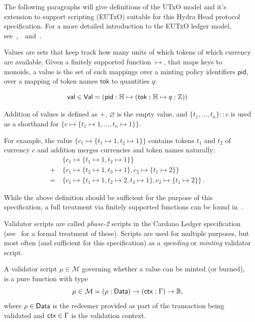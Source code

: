 The following paragraphs will give definitions of the UTxO model and it's
extension to support scripting (EUTxO) suitable for this Hydra Head protocol
specification. For a more detailed introduction to the EUTxO ledger model,
see~\cite{eutxo},~\cite{eutxo-2}~and~\cite{utxo-ma}.

\begin{definition}[Values]
  Values are sets that keep track how many units of which tokens of which
  currency are available. Given a finitely supported function $\mapsto$, that
  maps keys to monoids, a value is the set of such mappings over a minting
  policy identifiers $\mathsf{pid}$, over a mapping of token names
  $\mathsf{tok}$ to quantities $q$:

  \[
    \mathsf{val} \in \mathsf{Val} = (\mathsf{pid} : \mathbb{H} \mapsto (\mathsf{tok} : \mathbb{H} \mapsto q : \mathbb{Z}))
  \]

  Addition of values is defined as $+$, $\varnothing$ is the empty value,
  and \(\{t_1, \ldots, t_n\} :: c\) is used as a shorthand for
  \(\{c \mapsto \{t_1 \mapsto 1, \ldots, t_n \mapsto 1\}\}\).
\end{definition}

For example, the value $\{c_{1} \mapsto \{t_1 \mapsto 1, t_2 \mapsto 1\}\}$
contains tokens $t_1$ and $t_2$ of currency $c$ and addition merges currencies
and token names naturally:
\begin{align*}
  & \{c_{1} \mapsto \{t_1 \mapsto 1, t_2 \mapsto 1\}\} \\
  + \ & \{c_{1} \mapsto \{t_{2} \mapsto 1, t_3 \mapsto 1\}, c_{2} \mapsto \{ t_{1} \mapsto 2\}\} \\
  = \ & \{c_{1} \mapsto \{t_1 \mapsto 1, t_2 \mapsto 2, t_3 \mapsto 1\}, c_{2} \mapsto \{ t_{1} \mapsto 2\}\} \ .
\end{align*}

While the above definition should be sufficient for the purpose of this
specification, a full treatment via finitely supported functions can be found
in~\cite{utxo-ma}.

Validator scripts are called \emph{phase-2} scripts in the Cardano Ledger
specification (see~\cite{alozon-spec} for a formal treatment of these). Scripts
are used for multiple purposes, but most often (and sufficient for this
specification) as a \emph{spending} or \emph{minting} validator script.

\begin{definition}
  A validator script $\mu \in \mathcal{M}$ governing whether a value can be minted (or burned),
  is a pure function with type
  \[
    \mu \in \mathcal{M} = (\rho : \mathsf{Data}) \to (\mathsf{ctx} : \Gamma) \to\mathbb{B},
  \]
  where $\rho \in \mathsf{Data}$ is the redeemer provided as part of the transaction
  being validated and $\mathsf{ctx} \in \Gamma$ is the validation
  context.
\end{definition}

